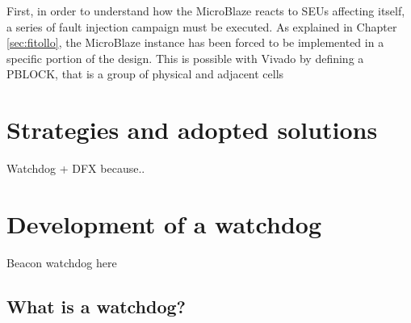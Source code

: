 First, in order to understand how the MicroBlaze reacts to SEUs affecting itself, a series of fault injection campaign must be executed. As explained in Chapter \ref{sec:fitollo}, the MicroBlaze instance has been forced to be implemented in a specific portion of the design. This is possible with Vivado by defining a PBLOCK, that is a group of physical and adjacent cells 



\section{Strategies and adopted solutions}




Watchdog + DFX because..

\section{Development of a watchdog}

Beacon watchdog here

\subsection{What is a watchdog?}

